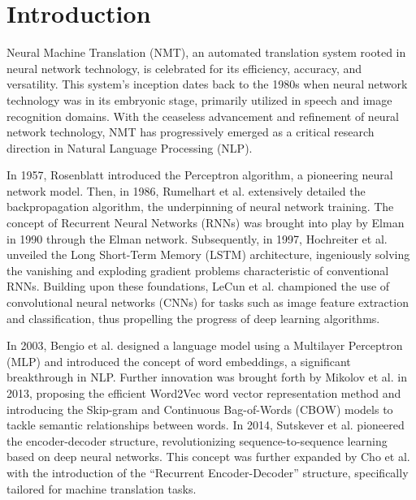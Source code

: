 \documentclass[acmsmall]{acmart}
\begin{document}


\maketitle

\section{Introduction}
\label{sec1}
Neural Machine Translation (NMT), an automated translation system rooted in neural network technology, is celebrated for its efficiency, accuracy, and versatility. This system's inception dates back to the 1980s when neural network technology was in its embryonic stage, primarily utilized in speech and image recognition domains. With the ceaseless advancement and refinement of neural network technology, NMT has progressively emerged as a critical research direction in Natural Language Processing (NLP).

In 1957, Rosenblatt\cite{1-0} introduced the Perceptron algorithm, a pioneering neural network model. Then, in 1986, Rumelhart et al. \cite{1-1} extensively detailed the backpropagation algorithm, the underpinning of neural network training. The concept of Recurrent Neural Networks (RNNs) was brought into play by Elman \cite{1-2b1} in 1990 through the Elman network. Subsequently, in 1997, Hochreiter et al. \cite{1-2b2} unveiled the Long Short-Term Memory (LSTM) architecture, ingeniously solving the vanishing and exploding gradient problems characteristic of conventional RNNs. Building upon these foundations, LeCun et al. \cite{1-2} championed the use of convolutional neural networks (CNNs) for tasks such as image feature extraction and classification, thus propelling the progress of deep learning algorithms.

In 2003, Bengio et al. \cite{1-3} designed a language model using a Multilayer Perceptron (MLP) and introduced the concept of word embeddings, a significant breakthrough in NLP. Further innovation was brought forth by Mikolov et al. \cite{1-3b1} in 2013, proposing the efficient Word2Vec word vector representation method and introducing the Skip-gram and Continuous Bag-of-Words (CBOW) models to tackle semantic relationships between words. In 2014, Sutskever et al. \cite{1-4} pioneered the encoder-decoder structure, revolutionizing sequence-to-sequence learning based on deep neural networks. This concept was further expanded by Cho et al. \cite{1-5} with the introduction of the ``Recurrent Encoder-Decoder'' structure, specifically tailored for machine translation tasks.
\end{document}
